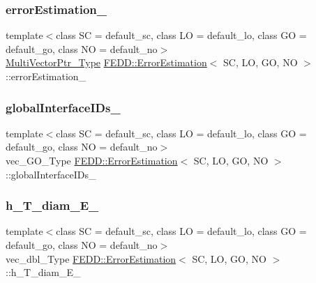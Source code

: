 \subsubsection{\texorpdfstring{error\+Estimation\+\_\+}{errorEstimation\_}}
{\footnotesize\ttfamily template$<$class SC = default\+\_\+sc, class LO = default\+\_\+lo, class GO = default\+\_\+go, class NO = default\+\_\+no$>$ \\
\hyperlink{classFEDD_1_1ErrorEstimation_a5882ff373bf8c409b407b4fd1f42bda0}{Multi\+Vector\+Ptr\+\_\+\+Type} \hyperlink{classFEDD_1_1ErrorEstimation}{F\+E\+D\+D\+::\+Error\+Estimation}$<$ SC, LO, GO, NO $>$\+::error\+Estimation\+\_\+\hspace{0.3cm}{\ttfamily [protected]}}

\mbox{\label{classFEDD_1_1ErrorEstimation_afb6eb1618023286bcbd18b59023752fb}} 
\subsubsection{\texorpdfstring{global\+Interface\+I\+Ds\+\_\+}{globalInterfaceIDs\_}}
{\footnotesize\ttfamily template$<$class SC = default\+\_\+sc, class LO = default\+\_\+lo, class GO = default\+\_\+go, class NO = default\+\_\+no$>$ \\
vec\+\_\+\+G\+O\+\_\+\+Type \hyperlink{classFEDD_1_1ErrorEstimation}{F\+E\+D\+D\+::\+Error\+Estimation}$<$ SC, LO, GO, NO $>$\+::global\+Interface\+I\+Ds\+\_\+\hspace{0.3cm}{\ttfamily [protected]}}

\mbox{\label{classFEDD_1_1ErrorEstimation_a984034d2b0306ed7c194c6ca5dbfbc40}} 
\subsubsection{\texorpdfstring{h\+\_\+\+T\+\_\+diam\+\_\+\+E\+\_\+}{h\_T\_diam\_E\_}}
{\footnotesize\ttfamily template$<$class SC = default\+\_\+sc, class LO = default\+\_\+lo, class GO = default\+\_\+go, class NO = default\+\_\+no$>$ \\
vec\+\_\+dbl\+\_\+\+Type \hyperlink{classFEDD_1_1ErrorEstimation}{F\+E\+D\+D\+::\+Error\+Estimation}$<$ SC, LO, GO, NO $>$\+::h\+\_\+\+T\+\_\+diam\+\_\+\+E\+\_\+\hspace{0.3cm}{\ttfamily [protected]}}

